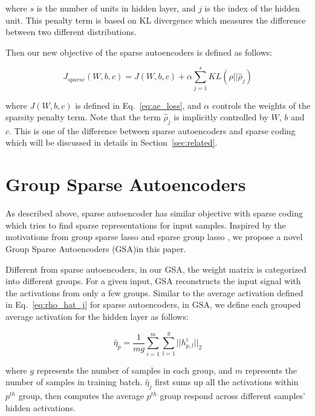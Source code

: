 \noindent where $s$ is the number of units in hidden layer, and $j$ is the index of the hidden unit. This penalty term is based on KL divergence which measures the difference between two different distributions.

Then our new objective of the sparse autoencoders is defined as follows:

\begin{equation}\label{eq:loss_sparse}
    J_{sparse}(W,b,c) = J(W,b,c) + \alpha \sum_{j=1}^s KL(\rho||\hat{\rho}_j)
\end{equation}

\noindent where $J(W,b,c)$ is defined in Eq.~\ref{eq:ae_loss}, and $\alpha$ controls the weights of the sparsity penalty term. Note that the term $\hat{\rho}_j$ is implicitly controlled by $W$, $b$ and $c$. This is one of the difference between sparse autoencoders and sparse coding which will be discussed in details in Section~\ref{sec:related}.




\section{Group Sparse Autoencoders}
As described above, sparse autoencoder has similar objective with sparse coding which tries to find sparse representations for input samples. Inspired by the motivations from group sparse lasso \cite{Yuan06modelselection} and sparse group lasso \cite{Simon13asparse-group}, we propose a novel Group Sparse Autoencoders (GSA)in this paper. 

Different from sparse autoencoders, in our GSA, the weight matrix is categorized into different groups. For a given input, GSA reconstructs the input signal with the activations from only a few groups. Similar to the average activation defined in Eq.~\ref{eq:rho_hat_j} for sparse autoencoders, in GSA, we define each grouped average activation for the hidden layer as follows: 


\begin{equation}\label{eq:eta_hat_j}
    \hat{\eta}_p = \frac{1}{mg}\sum_{i=1}^m \sum_{l=1}^g ||h^{i}_{p,l}||_2
\end{equation}

\noindent where $g$ represents the number of samples in each group, and $m$ represents the number of samples in training batch. $\hat{\eta}_j$ first sums up all the activations within $p^{th}$ group, then computes the average $p^{th}$ group respond across different samples' hidden activations. 

